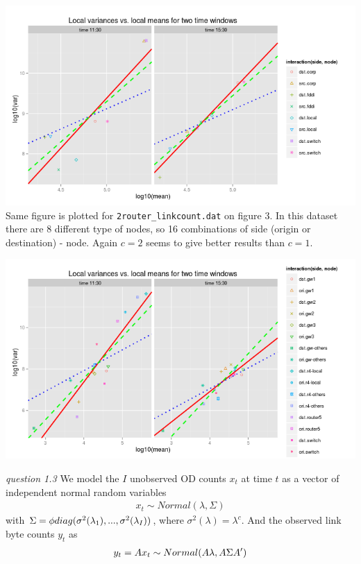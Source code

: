 \documentclass[twoside]{article}
\begin{document}
\begingroup
\centering
\includegraphics[scale=0.4]{./img/logvarlogmean.png}
\endgroup
\vspace{.2 in}
Same figure is plotted for \texttt{2router\_linkcount.dat} on figure 3. In this dataset there are 8 different type of nodes, so 16 combinations of side (origin or destination) - node. Again $c=2$ seems to give better results than $c=1$.

\begingroup
\centering
\includegraphics[scale=0.4]{./img/logvarlogmean2.png}
\endgroup

\vspace{.2 in}

\textit{question 1.3} We model the $I$ unobserved OD counts $x_t$ at time $t$ as a vector of independent normal random variables
\begin{align*}
x_t \sim Normal(\lambda, \Sigma)
\end{align*}
with $\Sigma = \phi \* diag(\sigma^2(\lambda_1), ..., \sigma^2(\lambda_I))$, where $\sigma^2(\lambda) = \lambda^c$. And the observed link byte counts $y_t$ as
\begin{align*}
y_t = A \* x_t \sim Normal(A \* \lambda, A \* \Sigma A')
\end{align*}
\end{document}
